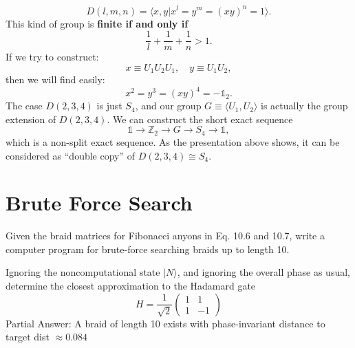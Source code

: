 \begin{equation*}
D( l,m,n) =\langle x,y|x^{l} =y^{m} =(xy )^{n} =1\rangle .
\end{equation*}
This kind of group is \textbf{finite if and only if}
\begin{equation*}
\frac{1}{l} +\frac{1}{m} +\frac{1}{n}  >1.
\end{equation*}
If we try to construct:
\begin{equation*}
x\equiv U_{1} U_{2} U_{1} ,\quad y\equiv U_{1} U_{2} ,
\end{equation*}
then we will find easily:
\begin{equation*}
x^{2} =y^{3} =( xy)^{4} =-\mathds{1}_{2} .
\end{equation*}
The case $D( 2,3,4)$ is just $S_{4}$, and our group $G\equiv \langle U_{1} ,U_{2} \rangle $ is actually the group extension of $D( 2,3,4)$. We can construct the short exact sequence
\begin{equation*}
\mathds{1}\rightarrow \mathbb{Z}_{2}\rightarrow G\rightarrow S_{4}\rightarrow \mathds{1} ,
\end{equation*}
which is a non-split exact sequence. As the presentation above shows, it can be considered as ``double copy'' of $D( 2,3,4) \cong S_{4}$. 

\section{Brute Force Search}
Given the braid matrices for Fibonacci anyons in Eq. 10.6 and 10.7, write a computer program for brute-force searching braids up to length 10.



Ignoring the noncomputational state $|N\rangle $, and ignoring the overall phase as usual, determine the closest approximation to the Hadamard gate
\begin{equation*}
H=\frac{1}{\sqrt{2}}\begin{pmatrix}
1 & 1\\
1 & -1
\end{pmatrix}
\end{equation*}
Partial Answer: A braid of length 10 exists with phase-invariant distance to target dist $\approx 0.084$

